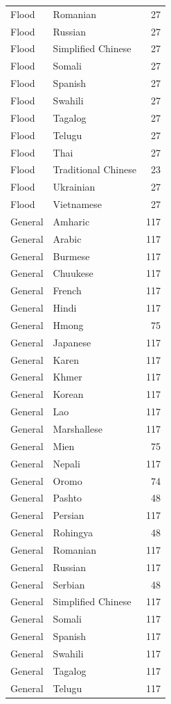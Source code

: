 \begin{longtable}{p{3cm} p{3cm} r}
Flood & Romanian & 27 \\
Flood & Russian & 27 \\
Flood & Simplified Chinese & 27 \\
Flood & Somali & 27 \\
Flood & Spanish & 27 \\
Flood & Swahili & 27 \\
Flood & Tagalog & 27 \\
Flood & Telugu & 27 \\
Flood & Thai & 27 \\
Flood & Traditional Chinese & 23 \\
Flood & Ukrainian & 27 \\
Flood & Vietnamese & 27 \\
General & Amharic & 117 \\
General & Arabic & 117 \\
General & Burmese & 117 \\
General & Chuukese & 117 \\
General & French & 117 \\
General & Hindi & 117 \\
General & Hmong & 75 \\
General & Japanese & 117 \\
General & Karen & 117 \\
General & Khmer & 117 \\
General & Korean & 117 \\
General & Lao & 117 \\
General & Marshallese & 117 \\
General & Mien & 75 \\
General & Nepali & 117 \\
General & Oromo & 74 \\
General & Pashto & 48 \\
General & Persian & 117 \\
General & Rohingya & 48 \\
General & Romanian & 117 \\
General & Russian & 117 \\
General & Serbian & 48 \\
General & Simplified Chinese & 117 \\
General & Somali & 117 \\
General & Spanish & 117 \\
General & Swahili & 117 \\
General & Tagalog & 117 \\
General & Telugu & 117 \\

\end{longtable}
